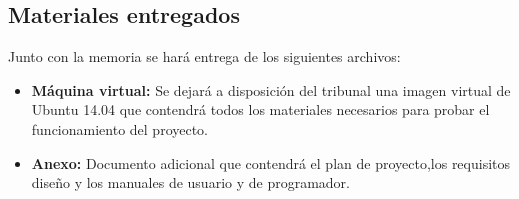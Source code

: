 
\subsection{Materiales entregados}
Junto con la memoria se hará entrega de los siguientes archivos:
	\begin{itemize}
	\item \textbf{Máquina virtual:} Se dejará a disposición del tribunal una imagen virtual de Ubuntu 14.04 que contendrá todos los materiales necesarios para probar el funcionamiento del proyecto.
	\item \textbf{Anexo:} Documento adicional que contendrá el plan de proyecto,los requisitos diseño y los manuales de usuario y de programador.
	\end{itemize}